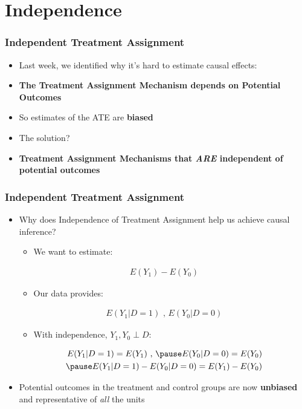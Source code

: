 \documentclass[xcolor=x11names,compress]{beamer}\usepackage[]{graphicx}\usepackage[]{color}
\renewcommand{\(}{\begin{columns}}
\renewcommand{\)}{\end{columns}}
\newcommand{\<}[1]{\begin{column}{#1}}
\renewcommand{\>}{\end{column}}
\begin{document}
\section{Independence}

\begin{frame}
\frametitle{Independent Treatment Assignment}
\begin{itemize}
\item Last week, we identified why it's hard to estimate causal effects:
\pause
\item \textbf{The Treatment Assignment Mechanism depends on Potential Outcomes}
\pause
\item So estimates of the ATE are \textbf{biased}
\pause
\item The solution?
\pause
\item \textbf{Treatment Assignment Mechanisms that \textit{ARE} independent of potential outcomes}
\end{itemize}
\end{frame}

\begin{frame}
\frametitle{Independent Treatment Assignment}
\begin{itemize}
\item Why does Independence of Treatment Assignment help us achieve causal inference?
\begin{itemize}
\item We want to estimate:
\end{itemize}
\begin{eqnarray}
E(Y_1) - E(Y_0)
\end{eqnarray}
\pause
\begin{itemize}
\item Our data provides:
\end{itemize}
\begin{eqnarray}
E(Y_1|D=1)\text{ ,   }E(Y_0|D=0)
\end{eqnarray}
\pause
\begin{itemize}
\item With independence, $Y_1, Y_0 \perp D$:
\end{itemize}
\begin{eqnarray}
E(Y_1|D=1) = E(Y_1) \text{ ,   }  \pause E(Y_0|D=0) = E(Y_0) \\
\pause
E(Y_1|D=1) - E(Y_0|D=0) = E(Y_1) - E(Y_0) \\
\end{eqnarray}
\item Potential outcomes in the treatment and control groups are now \textbf{unbiased} and representative of \textit{all} the units
\end{itemize}
\end{frame}
\end{document}
